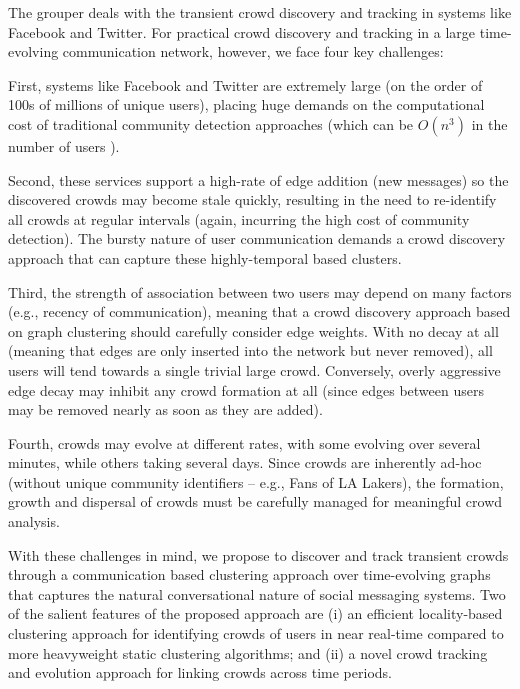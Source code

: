 \documentclass{sig-alternate}
\begin{document}
The grouper deals with the transient crowd discovery and tracking in systems like Facebook and Twitter. For practical crowd discovery and tracking in a large time-evolving communication network, however, we face four key challenges:

\begin{list}{}{\leftmargin= 0.3cm}

\item First, systems like Facebook and Twitter are extremely large (on the order
of 100s of millions of unique users), placing huge demands on the computational
cost of traditional community detection approaches (which can be $O(n^3)$ in the
number of users \cite{flake:cut-clustering}).

\item Second, these services support a high-rate of edge addition (new
messages) so the discovered crowds may become stale quickly, resulting in the need to
re-identify all crowds at regular intervals (again, incurring the high cost of
community detection). The bursty nature of user communication demands a crowd
discovery approach that can capture these highly-temporal based clusters.

\item Third, the strength of association between two users may depend on many
factors (e.g., recency of communication), meaning that a crowd discovery approach
based on graph clustering should carefully consider edge weights. With no decay
at all (meaning that edges are only inserted into the network but never removed),
all users will tend towards a single trivial large crowd. Conversely, overly
aggressive edge decay may inhibit any crowd formation at all (since edges between
users may be removed nearly as soon as they are added).

\item Fourth, crowds may evolve at different rates, with some evolving over
several minutes, while others taking several days. Since crowds are inherently
ad-hoc (without unique community identifiers -- e.g., Fans of LA Lakers), the
formation, growth and dispersal of crowds must be carefully managed for
meaningful crowd analysis.
\end{list}

With these challenges in mind, we propose to discover and track transient crowds
through a communication based clustering approach over time-evolving
graphs that captures the natural conversational nature of social messaging
systems. Two of the salient features of the proposed approach are (i) an
efficient locality-based clustering approach for identifying crowds of users in
near real-time compared to more heavyweight static clustering algorithms; and
(ii) a novel crowd tracking and evolution approach for linking crowds across time
periods.
\end{document}
